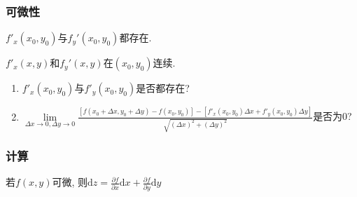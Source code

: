 \subsubsection{可微性}
\par \vspace{.5em}
$ f'_{x}(x_{0},y_{0}) $与$ f_{y}'(x_{0},y_{0}) $都存在.\par \vspace{.5em}
\par \vspace{.5em}
$ f'_{x}(x,y) $和$ f_{y}'(x,y) $在$ (x_{0},y_{0}) $连续.\par \vspace{.5em}
\par \vspace{.5em}
\begin{enumerate}
\item $ f'_{x}(x_{0},y_{0}) $与$ f'_{y}(x_{0},y_{0}) $是否都存在?
\item $ \lim\limits_{\Delta x \rightarrow 0, \Delta y\rightarrow 0}\frac{[f(x_{0}+\Delta x,y_{0}+\Delta y)-f(x_{0},y_{0})]-[f'_{x}(x_{0},y_{0})\Delta x+f'_{y}(x_{0},y_{0})\Delta y]}{\sqrt{(\Delta x)^{2}+(\Delta y)^{2}}} $是否为0?
\end{enumerate}
\subsubsection{计算}
若$ f(x,y) $可微, 则$ \mathrm{d}z=\frac{\partial f}{\partial x}\mathrm{d}x+\frac{\partial f}{\partial y}\mathrm{d}y $
